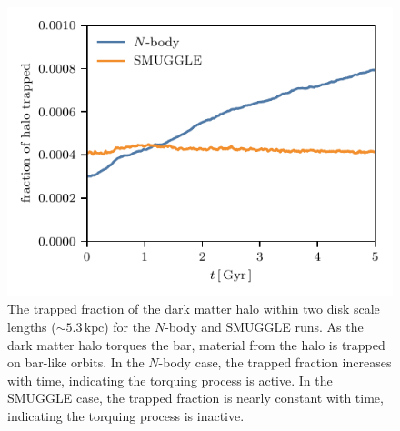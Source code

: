 \documentclass[twocolumn,linenumbers,trackchanges]{aastex631}
\newcommand{\Nbody}{$N$-body}
\newcommand{\SMUGGLE}{SMUGGLE}
\begin{document}
\begin{figure}
    \centering
    \includegraphics[width=\columnwidth]{fig/halo_trapped.pdf}
    \caption{The trapped fraction of the dark matter halo within two disk scale
    lengths ($\sim5.3\,\textrm{kpc}$) for the \Nbody{} and \SMUGGLE{} runs. As
    the dark matter halo torques the bar, material from the halo is trapped on
    bar-like orbits. In the \Nbody{} case, the trapped fraction increases with
    time, indicating the torquing process is active. In the \SMUGGLE{} case, the
    trapped fraction is nearly constant with time, indicating the torquing
    process is inactive.}
    \label{fig:htrap}
\end{figure}
\end{document}
